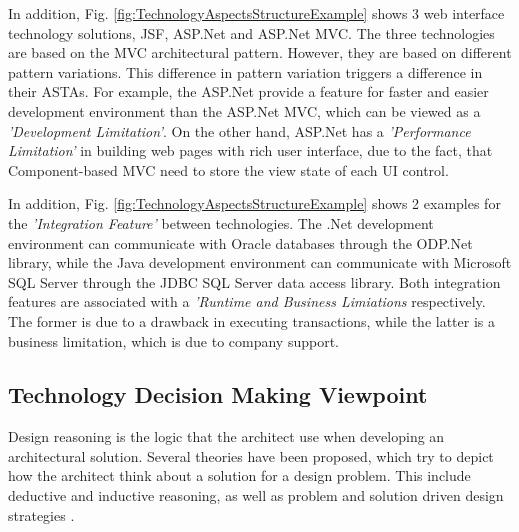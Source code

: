 \documentclass[conference]{IEEEtran}
\begin{document}
In addition, Fig. \ref{fig:TechnologyAspectsStructureExample} shows 3 web
interface technology solutions, JSF, ASP.Net and ASP.Net MVC. The three technologies are
based on the MVC architectural pattern. However, they are based on different
pattern variations. This difference in pattern variation triggers a difference
in their ASTAs. For example, the ASP.Net provide a feature for faster and easier
development environment than the ASP.Net MVC, which can be viewed as a
\textit{'Development Limitation'}. On the other hand, ASP.Net has a
\textit{'Performance Limitation'} in building web pages with rich user
interface, due to the fact, that Component-based MVC need to store the view
state of each UI control.

In addition, Fig. \ref{fig:TechnologyAspectsStructureExample} shows 2 examples
for the \textit{'Integration Feature'} between technologies. The .Net
development environment can communicate with Oracle databases through the ODP.Net library,
while the Java development environment can communicate with Microsoft SQL Server
through the JDBC SQL Server data access library. Both integration features are
associated with a \textit{'Runtime and Business Limiations} respectively. The
former  is due to a drawback in executing transactions, while the latter is a business
limitation, which is due to company support.
\subsection{Technology Decision Making Viewpoint}
\label{sec:Design}
Design reasoning is the logic that the architect use when developing an
architectural solution. Several theories have been proposed, which try to depict
how the architect think about a solution for a design problem. This include
deductive and inductive reasoning, as well as problem and solution driven design
strategies \cite{TangReasoningStrategy, TangBiasing}.
\end{document}
